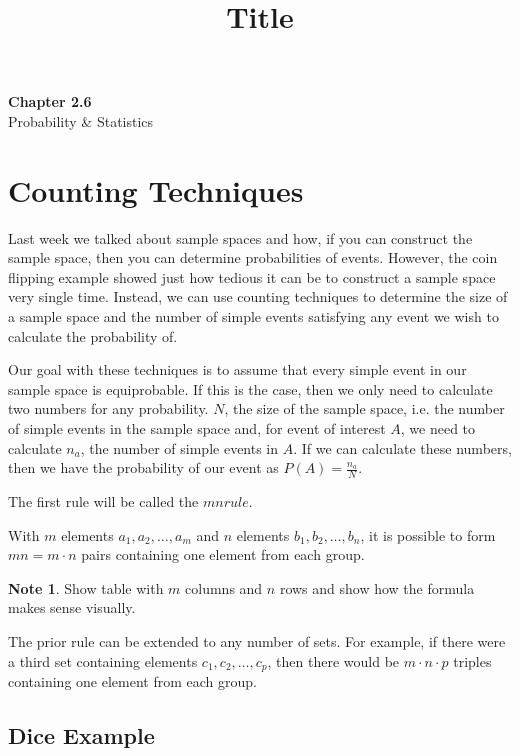 \documentclass[11pt]{article}
\theoremstyle{definition}
\newtheorem{note}{Note}
\begin{document}
\title{Title}

\thispagestyle{empty}

\begin{center}
{\LARGE \bf Chapter 2.6}\\
{\large Probability \& Statistics}
\end{center}
\section{Counting Techniques}

Last week we talked about sample spaces and how, if you can construct the sample space, then you can determine probabilities of events. However, the coin flipping example showed just how tedious it can be to construct a sample space very single time. Instead, we can use counting techniques to determine the size of a sample space and the number of simple events satisfying any event we wish to calculate the probability of.

Our goal with these techniques is to assume that every simple event in our sample space is equiprobable. If this is the case, then we only need to calculate two numbers for any probability. $N$, the size of the sample space, i.e. the number of simple events in the sample space and, for event of interest $A$, we need to calculate $n_a$, the number of simple events in $A$. If we can calculate these numbers, then we have the probability of our event as $P(A) = \frac{n_a}{N}$.

The first rule will be called the $mn rule$.

\begin{shaded}
	With $m$ elements $a_1, a_2, \ldots, a_m$ and $n$ elements $b_1, b_2, \ldots, b_n$, it is possible to form $mn = m \cdot n$ pairs containing one element from each group.
\end{shaded}

\begin{note}
	Show table with $m$ columns and $n$ rows and show how the formula makes sense visually.
\end{note}

The prior rule can be extended to any number of sets. For example, if there were a third set containing elements $c_1, c_2, \ldots, c_p$, then there would be $m \cdot n \cdot p$ triples containing one element from each group.

\subsection{Dice Example}
\end{document}
